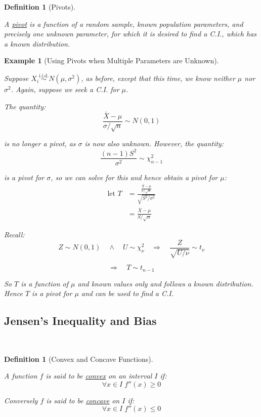 \documentclass[12pt,a4paper]{article}
\newtheorem{defn}[thm]{Definition}
\newtheorem{ex}[thm]{Example}
\begin{document}
\begin{defn}[Pivots]$\;$\par\vspace{1cm}

A \underline{pivot} is a function of a random sample, known population parameters, and precisely one unknown parameter, for which it is desired to find a C.I., which has a known distribution.

\end{defn}

\begin{ex}[Using Pivots when Multiple Parameters are Unknown]$\;$\par\vspace{1cm}

Suppose $X_i \overset{\text{i.i.d.}}{\sim} N(\mu,\sigma^2)$, as before, except that this time, we know neither $\mu$ nor $\sigma^2$. Again, suppose we seek a C.I. for $\mu$.

The quantity:
$$\frac{\bar{X}-\mu}{\sigma/\sqrt{n}} \sim N(0,1)$$

is no longer a pivot, as $\sigma$ is now also unknown. However, the quantity:
$$\frac{(n-1)S^2}{\sigma^2} \sim \chi^2_{n-1}$$

is a pivot for $\sigma$, so we can solve for this and hence obtain a pivot for $\mu$:
\begin{align*}
\text{let } T &= \frac{\frac{\bar{X}-\mu}{\sigma/\sqrt{n}}}{\sqrt{S^2/\sigma^2}}\\
&= \frac{\bar{X}-\mu}{S/\sqrt{n}}
\end{align*}

Recall:
$$Z\sim N(0,1) \quad \wedge\quad U \sim \chi^2_\nu \quad \Rightarrow\quad \frac{Z}{\sqrt{U/\nu}} \sim t_\nu$$

$$\Rightarrow\quad T \sim t_{n-1}$$

So $T$ is a function of $\mu$ and known values only and follows a known distribution. Hence $T$ is a pivot for $\mu$ and can be used to find a C.I.

\end{ex}

\subsection{Jensen's Inequality and Bias}$\;$

\begin{defn}[Convex and Concave Functions]$\;$\par\vspace{1cm}

A function $f$ is said to be \underline{convex} on an interval $I$ if:
$$\forall x\in I\;f''(x) \geq 0$$\par\vspace{1cm}

Conversely $f$ is said to be \underline{concave} on $I$ if:
$$\forall x \in I \; f''(x) \leq 0$$\par\vspace{1cm}

\end{defn}
\end{document}
